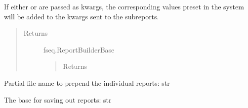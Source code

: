 \documentclass[letterpaper,10pt,english]{sphinxmanual}
\begin{document}
\begin{fulllineitems}
\begin{fulllineitems}
If either  or  are passed as kwargs,
the corresponding values preset in the system will be added to the
kwargs sent to the subreports.
\begin{quote}\begin{description}
\item[{Returns}] \leavevmode
fseq.ReportBuilderBase
\begin{quote}

Returns 
\end{quote}

\end{description}\end{quote}

\end{fulllineitems}


\begin{fulllineitems}
\label{fseq.reporting:fseq.reporting.report_builder.ReportBuilderBase.outputNamePrefix}
Partial file name to prepend the individual reports: str

\end{fulllineitems}


\begin{fulllineitems}
\label{fseq.reporting:fseq.reporting.report_builder.ReportBuilderBase.outputRoot}
The base for saving out reports: str

\end{fulllineitems}


\end{fulllineitems}

\end{document}
